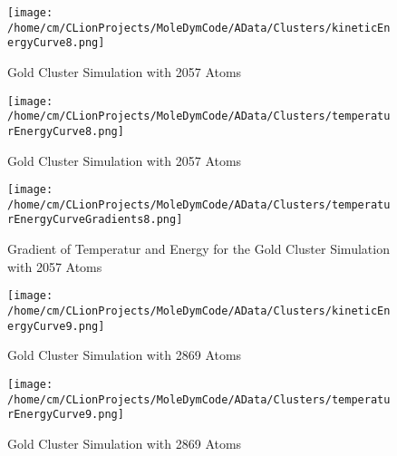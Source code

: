 \begin{figure}[!h] 
    \begin{center} 
        \texttt{[image: /home/cm/CLionProjects/MoleDymCode/AData/Clusters/kineticEnergyCurve8.png]} 
    \end{center} 
    \caption[Gold Cluster Simulation with 2057 Atoms]{Gold Cluster Simulation with 2057 Atoms} 
    \label{GoldClusterSimulationKineticTime2057} 
\end{figure} 
 
\begin{figure}[!h] 
    \begin{center} 
        \texttt{[image: /home/cm/CLionProjects/MoleDymCode/AData/Clusters/temperaturEnergyCurve8.png]} 
    \end{center} 
    \caption[Gold Cluster Simulation with 2057 Atoms]{Gold Cluster Simulation with 2057 Atoms} 
    \label{GoldClusterSimulationTemperaturEnergy2057} 
\end{figure} 
 
\begin{figure}[!h] 
    \begin{center} 
        \texttt{[image: /home/cm/CLionProjects/MoleDymCode/AData/Clusters/temperaturEnergyCurveGradients8.png]} 
    \end{center} 
    \caption[Gradient of Temperatur and Energy for the Gold Cluster Simulation with 2057 Atoms]{Gradient of Temperatur and Energy for the Gold Cluster Simulation with 2057 Atoms} 
    \label{GoldClusterSimulationGradient2057} 
\end{figure} 
 
\begin{figure}[!h] 
    \begin{center} 
        \texttt{[image: /home/cm/CLionProjects/MoleDymCode/AData/Clusters/kineticEnergyCurve9.png]} 
    \end{center} 
    \caption[Gold Cluster Simulation with 2869 Atoms]{Gold Cluster Simulation with 2869 Atoms} 
    \label{GoldClusterSimulationKineticTime2869} 
\end{figure} 
 
\begin{figure}[!h] 
    \begin{center} 
        \texttt{[image: /home/cm/CLionProjects/MoleDymCode/AData/Clusters/temperaturEnergyCurve9.png]} 
    \end{center} 
    \caption[Gold Cluster Simulation with 2869 Atoms]{Gold Cluster Simulation with 2869 Atoms} 
    \label{GoldClusterSimulationTemperaturEnergy2869} 
\end{figure} 
 

